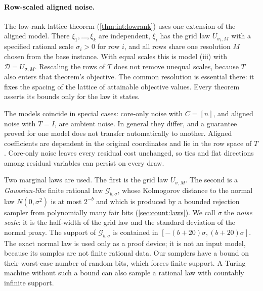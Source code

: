 \paragraph{Row-scaled aligned noise.}
The low-rank lattice theorem (\cref{thm:int:lowrank}) uses one extension of
the aligned model. There $\xi_1,\ldots,\xi_k$ are independent, $\xi_i$ has the
grid law $U_{\sigma_i,M}$ with a specified rational scale $\sigma_i>0$ for row
$i$, and all rows share one resolution $M$ chosen from the base instance.
With equal scales this is model (iii) with $\mathcal D=U_{\sigma,M}$.
Rescaling the rows of $T$ does not remove unequal scales, because $T$ also
enters that theorem's objective. The common resolution is essential there:
it fixes the spacing of the lattice of attainable objective values. Every
theorem asserts its bounds only for the law it states.

The models coincide in special cases: core-only noise with $C=[n]$, and
aligned noise with $T=I$, are ambient noise. In general they differ, and a
guarantee proved for one model does not transfer automatically to another.
Aligned coefficients are dependent in the original coordinates and lie in
the row space of $T$. Core-only noise leaves every residual cost unchanged,
so ties and flat directions among residual variables can persist on every
draw.

Two marginal laws are used. The first is the grid law $U_{\sigma,M}$. The
second is a \emph{Gaussian-like} finite rational law $\mathcal G_{b,\sigma}$,
whose Kolmogorov distance to the normal law $N(0,\sigma^2)$ is at most
$2^{-b}$ and which is produced by a bounded rejection sampler from
polynomially many fair bits (\cref{sec:count:laws}). We call $\sigma$ the
\emph{noise scale}: it is the half-width of the grid law and the standard
deviation of the normal proxy. The support of $\mathcal G_{b,\sigma}$ is
contained in $[-(b+20)\sigma,(b+20)\sigma]$. The
exact normal law is used only as a proof device; it is not an input model,
because its samples are not finite rational data.
Our samplers have a bound on their worst-case number of random bits, which
forces finite support. A Turing machine without such a bound can also sample
a rational law with countably infinite support.

